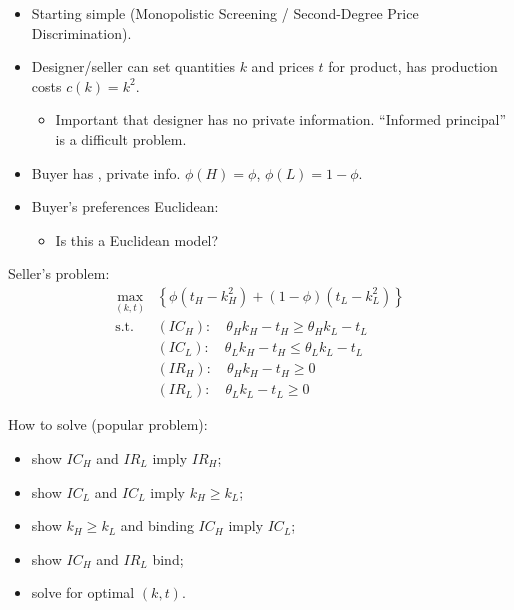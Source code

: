 \documentclass[english]{beamer}		%
\def\lyxframeend{} %
\begin{document}
\begin{itemize}
	\item Starting simple (Monopolistic Screening / Second-Degree Price Discrimination).
	\item Designer/seller can set quantities $k$ and prices $t$ for product, has production costs $c(k) = k^2$.
	\pause[2]
	\begin{itemize}
		\item Important that designer has no private information. ``Informed principal'' is a difficult problem.
	\end{itemize}
	\pause[0]
	\item Buyer has , private info. $\phi(H) = \phi$, $\phi(L)=1-\phi$.
	\item Buyer's preferences Euclidean: 
	\begin{itemize}
		\item Is this a Euclidean model? %
	\end{itemize}
\end{itemize}
\lyxframeend


Seller's problem:
\vspace{-1em}\begin{align*}
	\max_{(k,t)} & \left\{ \phi (t_H - k_H^2) + (1-\phi) (t_L - k_L^2) \right\}
	\\ \text{s.t. } & (IC_H):\quad \theta_H k_H - t_H \geq \theta_H k_L - t_L
	\\ & (IC_L):\quad \theta_L k_H - t_H \leq \theta_L k_L - t_L
	\\ & (IR_H):\quad \theta_H k_H - t_H \geq 0
	\\ & (IR_L):\quad \theta_L k_L - t_L \geq 0
\end{align*}\vspace{-0.5em}
\pause

How to solve (popular problem):
\begin{itemize}[<+->]
	\item show $IC_H$ and $IR_L$ imply $IR_H$;
	\item show $IC_L$ and $IC_L$ imply $k_H \geq k_L$;
	\item show $k_H \geq k_L$ and binding $IC_H$ imply $IC_L$;
	\item show $IC_H$ and $IR_L$ bind;
	\item solve for optimal $(k,t)$.
\end{itemize}
\vspace{-2em}
\lyxframeend
\end{document}
